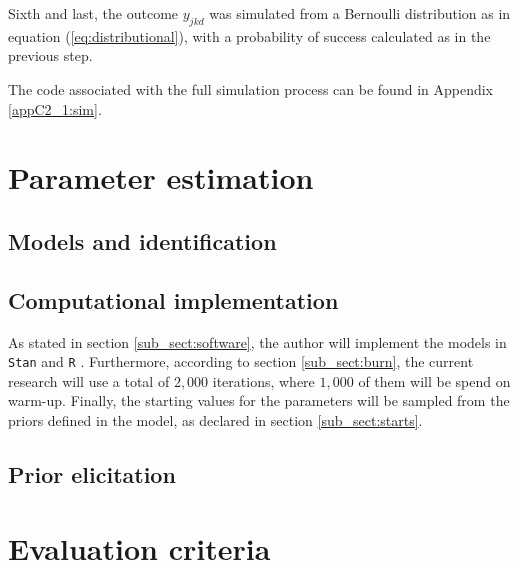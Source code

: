 Sixth and last, the outcome $y_{jkd}$ was simulated from a Bernoulli distribution as in equation (\ref{eq:distributional}), with a probability of success calculated as in the previous step.

The code associated with the full simulation process can be found in Appendix \ref{appC2_1:sim}.


\section{Parameter estimation}

\subsection{Models and identification}


\subsection{Computational implementation}

As stated in section \ref{sub_sect:software}, the author will implement the models in \texttt{Stan} \cite{Stan2020} and \texttt{R} \cite{R2015, RStan2020}. Furthermore, according to section \ref{sub_sect:burn}, the current research will use a total of $2,000$ iterations, where $1,000$ of them will be spend on warm-up. Finally, the starting values for the parameters will be sampled from the priors defined in the model, as declared in section \ref{sub_sect:starts}.


\subsection{Prior elicitation}






\section{Evaluation criteria}

